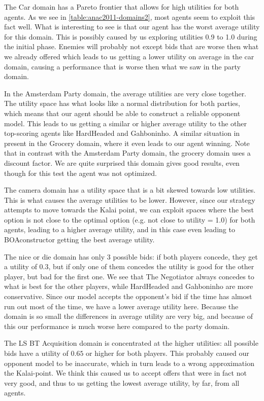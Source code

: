 The Car domain has a Pareto frontier that allows for high utilities for both agents. As we see in \autoref{table:anac2011-domains2}, most agents seem to exploit this fact well. What is interesting to see is that our agent has the worst average utility for this domain. This is possibly caused by us exploring utilities 0.9 to 1.0 during the initial phase. Enemies will probably not except bids that are worse then what we already offered which leads to us getting a lower utility on average in the car domain, causing a performance that is worse then what we saw in the party domain.

In the Amsterdam Party domain, the average utilities are very close together. The utility space has what looks like a normal distribution for both parties, which means that our agent should be able to construct a reliable opponent model. This leads to us getting a similar or higher average utility to the other top-scoring agents like HardHeaded and Gahboninho. A similar situation in present in the Grocery domain, where it even leads to our agent winning. Note that in contrast with the Amsterdam Party domain, the grocery domain uses a discount factor.
We are quite surprised this domain gives good results, even though for this test the agent was not optimized.

The camera domain has a utility space that is a bit skewed towards low utilities. This is what causes the average utilities to be lower. However, since our strategy attempts to move towards the Kalai point, we can exploit spaces where the best option is not close to the optimal option (e.g. not close to utility = 1.0) for both agents, leading to a higher average utility, and in this case even leading to BOAconstructor getting the best average utility. 

The nice or die domain has only 3 possible bids: if both players concede, they get a utility of 0.3, but if only one of them concedes the utility is good for the other player, but bad for the first one. We see that The Negotiator always concedes to what is best for the other players, while HardHeaded and Gahboninho are more conservative. Since our model accepts the opponent's bid if the time has almost run out most of the time, we have a lower average utility here. Because the domain is so small the differences in average utility are very big, and because of this our performance is much worse here compared to the party domain.

The LS BT Acquisition domain is concentrated at the higher utilities: all possible bids have a utility of $0.65$ or higher for both players. This probably caused our opponent model to be inaccurate, which in turn leads to a wrong approximation the Kalai-point. We think this caused us to accept offers that were in fact not very good, and thus to us getting the lowest average utility, by far, from all agents.


